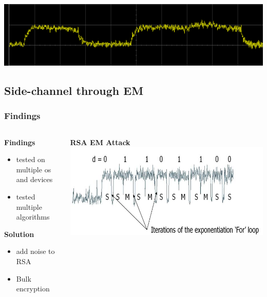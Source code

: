\documentclass{beamer}
\begin{document}
		\begin{frame}
		  \includegraphics[width= \textwidth]{Images/Power_attack.png} 
		\end{frame}
	\subsection{Side-channel through EM}
		
		\begin{frame}
		\frametitle{Findings}
		\begin{columns}[T]
		\begin{column}{.45\textwidth}
		\textbf{Findings}
		\begin{itemize}
		\item tested on multiple os and devices
		\item tested multiple algorithms
		\end{itemize}
		\textbf{Solution}
		\begin{itemize}
		\item add noise to RSA
		\item Bulk encryption
		\end{itemize}
		 
		
		\end{column}
		\begin{column}{.45\textwidth}
		\textbf{RSA EM Attack}
		\includegraphics[scale=.3]{Images/RSA.jpg}
		\end{column}
		\end{columns}
	
		
			
		\end{frame}
\end{document}
